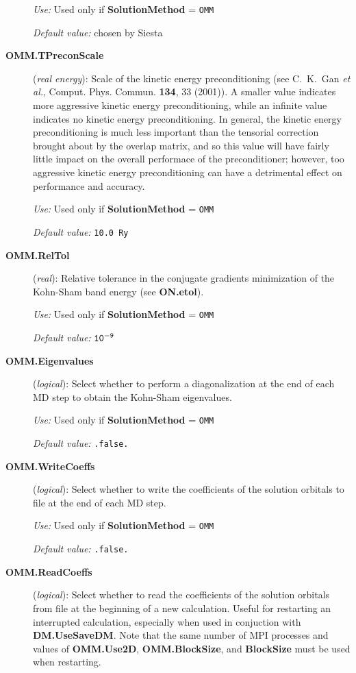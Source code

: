 \documentclass[11pt]{article}
\begin{document}
\begin{description}
{\it Use:} Used only if {\bf SolutionMethod} = {\tt OMM}

{\it Default value:} chosen by {\sc Siesta}

\item[{\bf OMM.TPreconScale}] ({\it real energy}):
Scale of the kinetic energy preconditioning (see C.~K.~Gan {\em et al.}, Comput. Phys. Commun.
{\bf 134}, 33 (2001)). A smaller value indicates more aggressive kinetic energy preconditioning,
while an infinite value indicates no kinetic energy preconditioning. In general, the kinetic
energy preconditioning is much less important than the tensorial correction brought about by
the overlap matrix, and so this value will have fairly little impact on the overall performace
of the preconditioner; however, too aggressive kinetic energy preconditioning can have a
detrimental effect on performance and accuracy.

{\it Use:} Used only if {\bf SolutionMethod} = {\tt OMM}

{\it Default value:} {\tt 10.0 Ry}

\item[{\bf OMM.RelTol}] ({\it real}):
Relative tolerance in the conjugate gradients minimization of the Kohn-Sham band energy (see
{\bf ON.etol}).

{\it Use:} Used only if {\bf SolutionMethod} = {\tt OMM}

{\it Default value:} ${\tt 10^{-9}}$

\item[{\bf OMM.Eigenvalues}] ({\it logical}):
Select whether to perform a diagonalization at the end of each MD step to obtain the Kohn-Sham
eigenvalues.

{\it Use:} Used only if {\bf SolutionMethod} = {\tt OMM}

{\it Default value:} {\tt .false.}

\item[{\bf OMM.WriteCoeffs}] ({\it logical}):
Select whether to write the coefficients of the solution orbitals to file at the end of each MD
step.

{\it Use:} Used only if {\bf SolutionMethod} = {\tt OMM}

{\it Default value:} {\tt .false.}

\item[{\bf OMM.ReadCoeffs}] ({\it logical}):
Select whether to read the coefficients of the solution orbitals from file at the beginning of
a new calculation. Useful for restarting an interrupted calculation, especially when used in
conjuction with {\bf DM.UseSaveDM}. Note that the same number of MPI processes and values of
{\bf OMM.Use2D}, {\bf OMM.BlockSize}, and {\bf BlockSize} must be used when restarting.


\end{description}
\end{document}
